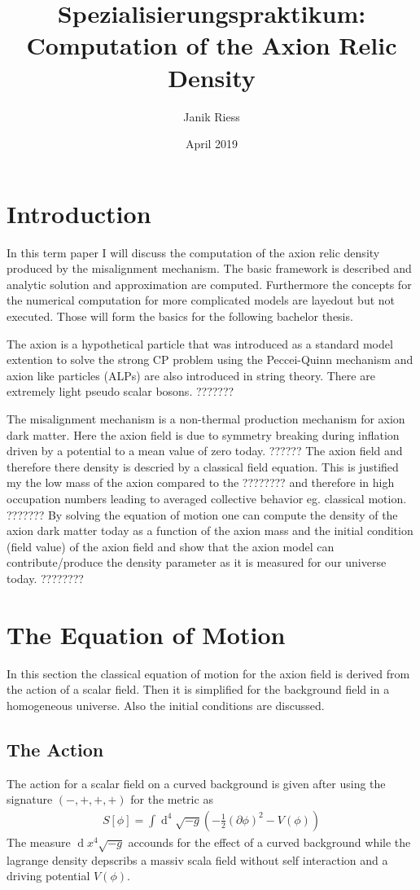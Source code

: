 \documentclass[a4paper]{article}
\title{Spezialisierungspraktikum: \\ Computation of the Axion Relic Density}
\author{Janik Riess }
\date{April 2019}
\DeclareMathOperator*{\diff}{d}
\begin{document}
\maketitle
\tableofcontents
\newpage

\section{Introduction}
In this term paper I will discuss the
computation of the axion relic density produced by the misalignment mechanism. The basic framework is
described and analytic solution and approximation are computed.
Furthermore the concepts for the numerical computation for more complicated models are layedout but not executed. Those will form the basics for the following bachelor thesis.

The axion is a hypothetical particle that was introduced as a standard model
extention to solve the strong CP problem using the Peccei-Quinn mechanism and axion like particles (ALPs) are also
introduced in string theory. There are extremely light pseudo scalar bosons. ???????

The misalignment mechanism is a non-thermal production mechanism for axion dark matter.
Here the axion field is due to symmetry breaking during inflation driven by a potential
to a mean value of zero today. ??????
The axion field and therefore there density is descried by a classical field equation.
This is justified my the low mass of the axion compared to the ????????
and therefore in high occupation numbers leading to averaged collective behavior
eg. classical motion. ???????
By solving the equation of motion one can compute the density of the axion dark matter
today as a function of the axion mass and the initial condition (field value)
of the axion field and show that the axion model can contribute/produce the density parameter as it is measured for our universe today. ????????

\section{The Equation of Motion}
In this section the classical equation of motion for the axion field is derived from the action of a scalar field. Then it is simplified for the background field in a homogeneous universe. Also the initial conditions are discussed.

\subsection{The Action}
The action for a scalar field on a curved background is given after \cite[Chap. 4.1, Page 25]{MarshAxionCosmo}
using the signature $(-, +, +, +)$ for the metric as
\begin{align}
    \label{eq:action}
    S[\phi] = \int \diff ^4 \sqrt{-g} \left(- \frac{1}{2} (\partial \phi)^2 - V(\phi) \right)
\end{align}
The measure $\diff x^4 \sqrt{-g}$ accounds for the effect of a curved background while
the lagrange density depscribs a massiv scala field without self interaction
and a driving potential $V(\phi)$.
\end{document}
